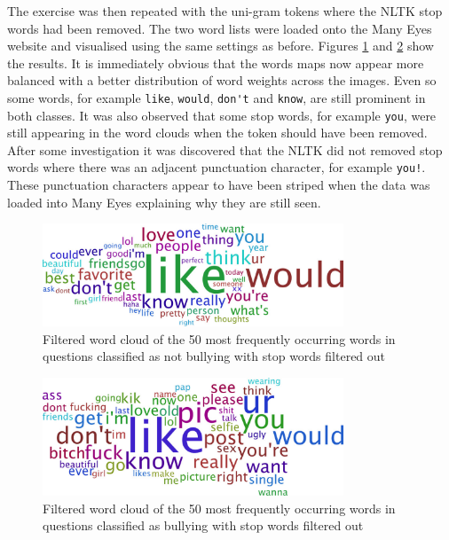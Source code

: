 The exercise was then repeated with the uni-gram tokens where the NLTK stop words had been removed. The two word lists were loaded onto the Many Eyes website and visualised using the same settings as before. Figures  \ref{fig:chapter4:not_bullying_wordcloud_filtered} and \ref{fig:chapter4:bullying_wordcloud_filtered} show the results. It is immediately obvious that the words maps now appear more balanced with a better distribution of word weights across the images. Even so some words, for example \verb|like|, \verb|would|, \verb|don't| and \verb|know|, are still prominent in both classes. It was also observed that some stop words, for example \verb|you|, were still appearing in the word clouds when the token should have been removed. After some investigation it was discovered that the NLTK did not removed stop words where there was an adjacent punctuation character, for example \verb|you!|. These punctuation characters appear to have been striped when the data was loaded into Many Eyes explaining why they are still seen.  

\begin{figure}[!htb]
	\centering
	\includegraphics[width=0.8\textwidth]{Figures/Chapter4/not_bullying_wordcloud_filtered.jpg}
	\caption[Filtered word cloud of not bullying words]{Filtered word cloud of the 50 most frequently occurring words in questions classified as not bullying with stop words filtered out}
	\label{fig:chapter4:not_bullying_wordcloud_filtered}
\end{figure}

\begin{figure}[!htb]
	\centering
	\includegraphics[width=0.8\textwidth]{Figures/Chapter4/bullying_wordcloud_filtered.jpg}
	\caption[Filtered word cloud of bullying words]{Filtered word cloud of the 50 most frequently occurring words in questions classified as bullying with stop words filtered out}
	\label{fig:chapter4:bullying_wordcloud_filtered}
\end{figure}

